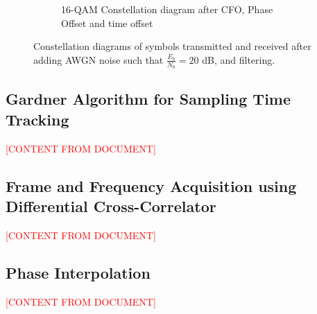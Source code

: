 \begin{figure}[H]
\begin{subfigure}[b]{0.48\textwidth}
		\caption{16-QAM Constellation diagram after CFO, Phase Offset and time offset}
		\label{fig:cfo-po-to-sub}
	\end{subfigure}
	\caption{Constellation diagrams of symbols transmitted and received after adding AWGN noise such that $\frac{E_b}{N_0} = 20$ dB, and filtering.}
	\label{fig:cfo-combined}
\end{figure}


\subsection{Gardner Algorithm for Sampling Time Tracking}
\textcolor{red}{[CONTENT FROM DOCUMENT]}
\subsection{Frame and Frequency Acquisition using Differential Cross-Correlator}
\textcolor{red}{[CONTENT FROM DOCUMENT]}
\subsection{Phase Interpolation}
\textcolor{red}{[CONTENT FROM DOCUMENT]}